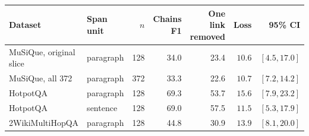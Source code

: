 \begin{tabular}{@{}llrrrrr@{}}
\toprule
Dataset & Span unit & $n$ & Chains F1 & One link removed & Loss & 95\% CI \\
\midrule
MuSiQue, original slice & paragraph & 128 & 34.0 & 23.4 & $10.6$ & $[4.5,17.0]$ \\
MuSiQue, all 372 & paragraph & 372 & 33.3 & 22.6 & $10.7$ & $[7.2,14.2]$ \\
HotpotQA & paragraph & 128 & 69.3 & 53.7 & $15.6$ & $[7.9,23.2]$ \\
HotpotQA & sentence & 128 & 69.0 & 57.5 & $11.5$ & $[5.3,17.9]$ \\
2WikiMultiHopQA & paragraph & 128 & 44.8 & 30.9 & $13.9$ & $[8.1,20.0]$ \\
\bottomrule
\end{tabular}
